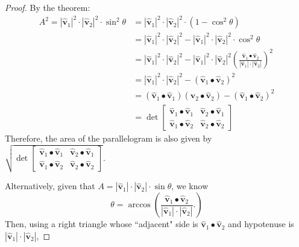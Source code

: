 \documentclass[newpage,hints,handout]{ximera}
\begin{document}
\begin{proof}
By the theorem:
\begin{align*}
A^2 = |\hat{\mathbf v}_{1}|^2 \cdot |\hat{\mathbf v}_{2} |^2 \cdot\sin^{2}\theta 
&= |\hat{\mathbf v}_{1}|^2 \cdot |\hat{\mathbf v}_{2} |^2 \cdot \left(1- \cos^{2}\theta\right)\\
&= |\hat{\mathbf v}_{1}|^2 \cdot |\hat{\mathbf v}_{2} |^2 - |\hat{\mathbf v}_{1}|^2 \cdot |\hat{\mathbf v}_{2} |^2 \cdot\cos^{2}\theta \\
&= |\hat{\mathbf v}_{1}|^2 \cdot |\hat{\mathbf v}_{2} |^2 - |\hat{\mathbf v}_{1}|^2 \cdot |\hat{\mathbf v}_{2} |^2 \left(  \frac{\hat{\mathbf v}_{1}\bullet\hat{\mathbf v}_{2}}{\left\vert \hat{\mathbf v}_{1}\right\vert \cdot\left\vert \hat{\mathbf v}_{2}\right\vert}\right)^2\\
&= |\hat{\mathbf v}_{1}|^2 \cdot |\hat{\mathbf v}_{2} |^2 - \left(\hat{\mathbf v}_{1}\bullet\hat{\mathbf v}_{2}\right)^2\\
&= \left(\hat{\mathbf v}_{1}\bullet\hat{\mathbf v}_{1}\right) \left(\hat{\mathbf v}_{2}\bullet\hat{\mathbf v}_{2}\right) - \left(\hat{\mathbf v}_{1}\bullet\hat{\mathbf v}_{2}\right)^2\\
&=\det
    \begin{bmatrix}
      \hat{\mathbf v}_{1}\bullet\hat{\mathbf v}_{1} & \hat{\mathbf v}_{2}\bullet\hat{\mathbf v}_{1}\\
      \hat{\mathbf v}_{1}\bullet\hat{\mathbf v}_{2} & \hat{\mathbf v}_{2}\bullet\hat{\mathbf v}_{2}
    \end{bmatrix}
\end{align*}
Therefore, the area of the parallelogram is also given by
$\sqrt{\det
    \begin{bmatrix}
      \hat{\mathbf v}_{1}\bullet\hat{\mathbf v}_{1} & \hat{\mathbf v}_{2}\bullet\hat{\mathbf v}_{1}\\
      \hat{\mathbf v}_{1}\bullet\hat{\mathbf v}_{2} & \hat{\mathbf v}_{2}\bullet\hat{\mathbf v}_{2}
    \end{bmatrix}}$.

Alternatively, given that $A = |\hat{\mathbf v}_{1}| \cdot |\hat{\mathbf v}_{2}| \cdot\sin\theta$, we know
\[
\theta = \arccos \left( 
	\frac{\hat{\mathbf v}_{1}\bullet\hat{\mathbf v}_{2}}{\left\vert \hat{\mathbf v}_{1}\right\vert \cdot\left\vert \hat{\mathbf v}_{2}\right\vert}.
		 \right)
\]
Then, using a right triangle whose ``adjacent" side is $\hat{\mathbf v}_{1}\bullet\hat{\mathbf v}_{2}$ and hypotenuse is $\left\vert \hat{\mathbf v}_{1}\right\vert \cdot\left\vert \hat{\mathbf v}_{2}\right\vert$,


\end{proof}
\end{document}
